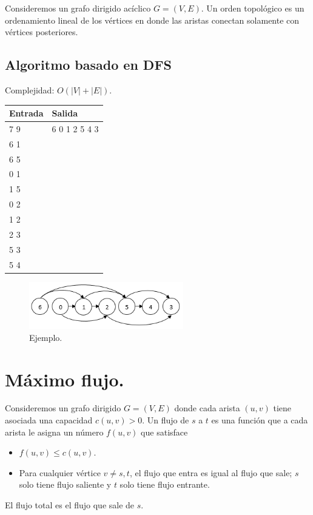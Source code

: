 \documentclass[12pt, letterpaper, twoside]{article}
\begin{document}
Consideremos un grafo dirigido acíclico $G = (V, E)$. Un orden topológico es un ordenamiento lineal de los vértices en donde las aristas conectan solamente con vértices posteriores.

\subsection{Algoritmo basado en DFS}

Complejidad: $O(|V| + |E|)$.

 \medskip

\begin{tabular}{|p{7cm}|p{7cm}|}
\hline
\textbf{Entrada} & \textbf{Salida}\\ \hline
7 9 & 6 0 1 2 5 4 3\\
6 1 & \\
6 5 & \\
0 1 & \\
1 5 & \\
0 2 & \\
1 2 & \\
2 3 & \\
5 3 & \\ 
5 4 & \\ \hline
\end{tabular}

\begin{figure}[h]
	\centering
	\includegraphics[width = 0.6\textwidth]{TopoSort.png}
	
	\caption{Ejemplo.}
\end{figure}

\newpage

\section{Máximo flujo.}

Consideremos un grafo dirigido $G = (V, E)$ donde cada arista $(u, v)$ tiene asociada una capacidad $c(u,v) > 0$. Un flujo de $s$ a $t$ es una función que a cada arista le asigna un número $f(u,v)$ que satisface
\begin{itemize}
\item $f(u, v) \leq c(u,v)$.
\item Para cualquier vértice $v \neq s, t$, el flujo que entra es igual al flujo que sale; $s$ solo tiene flujo saliente y $t$ solo tiene flujo entrante.
\end{itemize}
El flujo total es el flujo que sale de $s$.
\end{document}
